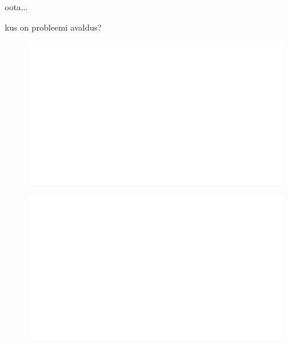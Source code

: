 \noindent
oota...

kus on probleemi avaldus?



\begin{centering}
    \begin{figure}[h]
        \centering
        \includegraphics[width=\textwidth]{whyareyoucheckingthenameofthisfile.png}
    \end{figure}
\end{centering}

\begin{centering}
    \begin{figure}[h!]
        \centering
        \includegraphics[width=\textwidth]{whyareyoucheckingthenameofthisfile.png}
    \end{figure}
\end{centering}

